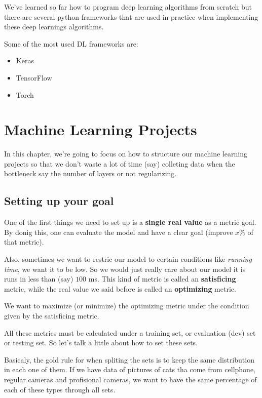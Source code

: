 \documentclass[12pt, a4paper, oneside]{book}
\begin{document}
We've learned so far how to program deep learning algorithms from scratch but
there are several python frameworks that are used in practice when implementing
these deep learnings algorithms.

Some of the most used DL frameworks are:
\begin{itemize}
    \item Keras
    \item TensorFlow
    \item Torch
\end{itemize}


\chapter{Machine Learning Projects}%
\label{cha:machine_learning_projects}

In this chapter, we're going to focus on how to structure our machine learning
projects so that we don't waste a lot of time (say) colleting data when the
bottleneck say the number of layers or not regularizing.

\section{Setting up your goal}%
\label{sec:setting_up_your_goal}

One of the first things we need to set up is a \textbf{single real value} as a
metric goal. By donig this, one can evaluate the model and have a clear goal
(improve $x\%$ of that metric).

Also, sometimes we want to restric our model to certain conditions like
\textit{running time}, we want it to be low. So we would just really care about
our model it is runs in less than (say) $100$ ms. This kind of metric is called
an \textbf{satisficing} metric, while the real value we said before is called an
\textbf{optimizing} metric.

We want to maximize (or minimize) the optimizing metric under the condition
given by the satisficing metric.

All these metrics must be calculated under a training set, or evaluation (dev)
set or testing set. So let's talk a little about how to set these sets.

Basicaly, the gold rule for when spliting the sets is to keep the same
distribution in each one of them. If we have data of pictures of cats tha come
from cellphone, regular cameras and profisional cameras, we want to have the
same percentage of each of these types through all sets.
\end{document}
